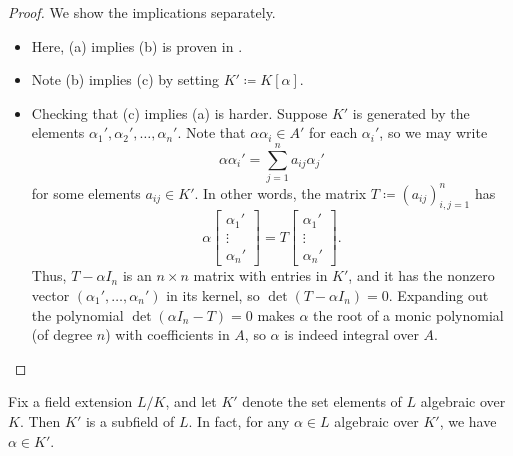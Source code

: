 \documentclass[../notes.tex]{subfiles}
\begin{document}
\begin{proof}
	We show the implications separately.
	\begin{itemize}
		\item Here, (a) implies (b) is proven in .
		\item Note (b) implies (c) by setting $K'\coloneqq K[\alpha]$.
		\item Checking that (c) implies (a) is harder. Suppose $K'$ is generated by the elements $\alpha_1',\alpha_2',\ldots,\alpha_n'$. Note that $\alpha\alpha_i\in A'$ for each $\alpha_i'$, so we may write
		\[\alpha\alpha_i'=\sum_{j=1}^na_{ij}\alpha_j'\]
		for some elements $a_{ij}\in K'$. In other words, the matrix $T\coloneqq(a_{ij})_{i,j=1}^n$ has
		\[\alpha\begin{bmatrix}
			\alpha_1' \\
			\vdots \\
			\alpha_n'
		\end{bmatrix}=T\begin{bmatrix}
			\alpha_1' \\
			\vdots \\
			\alpha_n'
		\end{bmatrix}.\]
		Thus, $T-\alpha I_n$ is an $n\times n$ matrix with entries in $K'$, and it has the nonzero vector $(\alpha_1',\ldots,\alpha_n')$ in its kernel, so $\det(T-\alpha I_n)=0$. Expanding out the polynomial $\det(\alpha I_n-T)=0$ makes $\alpha$ the root of a monic polynomial (of degree $n$) with coefficients in $A$, so $\alpha$ is indeed integral over $A$.
		\qedhere
	\end{itemize}
\end{proof}
\begin{corollary} \label{cor:alg-elements-form-field}
	Fix a field extension $L/K$, and let $K'$ denote the set elements of $L$ algebraic over $K$. Then $K'$ is a subfield of $L$. In fact, for any $\alpha\in L$ algebraic over $K'$, we have $\alpha\in K'$.
\end{corollary}
\end{document}
